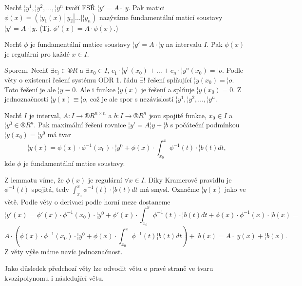 \documentclass[12pt]{article}                   %
\begin{document}
        \begin{definice}
            Nechť $¦y^1, ¦y^2, …, ¦y^n$ tvoří FSŘ $¦y' = A·¦y$. Pak matici $\phi(x) = (¦y_1(x)|¦y_2|…|¦y_n)$ nazýváme fundamentální maticí soustavy $¦y' = A·¦y$. (Tj. $\phi'(x) = A·\phi(x)$.)
        \end{definice}

        \begin{lemma}
            Nechť $\phi$ je fundamentální matice soustavy $¦y' = A·¦y$ na intervalu $I$. Pak $\phi(x)$ je regulární pro každé $x \in I$.

            \begin{dukazin}
                Sporem. Nechť $\exists c_i \in ®R$ a $\exists x_0 \in I$, $c_1·¦y^1(x_0) + … + c_n·¦y^n(x_0) = ¦o$. Podle věty o existenci řešení systému ODR 1. řádu $\exists!$ řešení splňující $¦y(x_0) = ¦o$. Toto řešení je ale $¦y ≡ 0$. Ale i funkce $¦y(x)$ je řešení a splňuje $¦y(x_0) = 0$. Z jednoznačnosti $¦y(x) ≡ ¦o$, což je ale spor s nezávislostí $¦y^1, ¦y^2, …, ¦y^n$.
            \end{dukazin}
        \end{lemma}

        \begin{veta}
            Nechť $I$ je interval, $A: I \rightarrow ®R^{n \times n}$ a $b: I \rightarrow ®R^n$ jsou spojité funkce, $x_0 \in I$ a $¦y^0 \in ®R^n$. Pak maximální řešení rovnice $¦y' = A¦y + ¦b$ s počáteční podmínkou $¦y(x_0) = ¦y^0$ má tvar
            $$ ¦y(x) = \phi(x)·\phi^{-1}(x_0)·¦y^0 + \phi(x)·\int_{x_0}^x \phi^{-1}(t)·¦b(t)dt, $$
            kde $\phi$ je fundamentální matice soustavy.

            \begin{dukazin}
                Z lemmatu víme, že $\phi(x)$ je regulární $\forall x \in I$. Díky Kramerově pravidlu je $\phi^{-1}(t)$ spojitá, tedy $\int_{x_0}^x \phi^{-1}(t)·¦b(t)dt$ má smysl. Označme $¦y(x)$ jako ve větě. Podle věty o derivaci podle horní meze dostaneme
                $$ ¦y'(x) = \phi'(x)·\phi^{-1}(x_0)·¦y^0 + \phi'(x)·\int_{x_0}^x \phi^{-1}(t)·¦b(t) dt + \phi(x)·\phi^{-1}(x)·¦b(x) = $$
                $$ A·(\phi(x)·\phi^{-1}(x_0)·¦y^0 + \phi(x)·\int_{x_0}^x \phi^{-1}(t)¦b(t)dt) + ¦b(x) = A·¦y(x)+¦b(x). $$
                Z věty výše máme navíc jednoznačnost.
            \end{dukazin}
        \end{veta}

        \begin{dusledek}
            Jako důsledek předchozí věty lze odvodit větu o pravé straně ve tvaru kvazipolynomu i následující větu.
        \end{dusledek}
\end{document}
